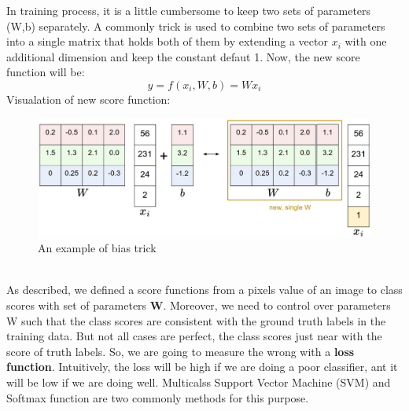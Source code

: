 In training process, it is a little cumbersome to keep two sets of parameters (W,b) separately. A commonly trick is used to combine two sets of parameters into a single matrix that holds both of them by extending a vector \textbf{$x_i$} with one additional dimension and keep the constant defaut 1. Now, the new score function will be:
\begin{equation}
	y = f(x_i,W,b) = Wx_i
\end{equation}
Visualation of new score function:
\begin{figure}[h]
	\centering
	\includegraphics[scale=0.3]{images/lncba}
	\caption{An example of bias trick}
	\label{figlncex}
\end{figure}~\\
As described, we defined a score functions from a pixels value of an image to class scores with set of parameters \textbf{W}. Moreover, we need to control over parameters W such that the class scores are consistent with the ground truth labels in the training data. But not all cases are perfect, the class scores just near with the score of truth labels. So, we are going to measure the wrong with a \textbf{loss function}. Intuitively, the loss will be high if we are doing a poor classifier, ant it will be low if we are doing well. Multicalss Support Vector Machine (SVM) and Softmax function are two commonly methods for this purpose.
